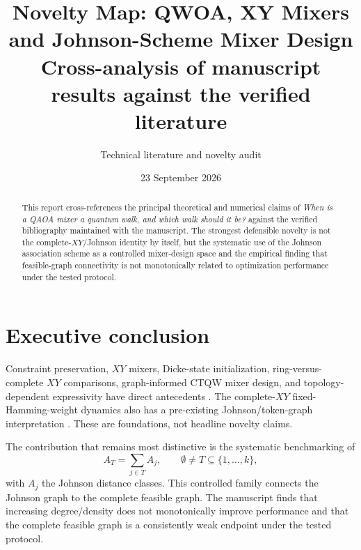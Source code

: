 \documentclass[11pt]{article}
\title{\textbf{Novelty Map: QWOA, XY Mixers and Johnson-Scheme Mixer Design}\\\large Cross-analysis of manuscript results against the verified literature}
\author{Technical literature and novelty audit}\date{23 September 2026}
\begin{document}
\maketitle
\begin{abstract}
This report cross-references the principal theoretical and numerical claims of
\emph{When is a QAOA mixer a quantum walk, and which walk should it be?} against the verified bibliography maintained with the manuscript. The strongest defensible novelty is not the complete-$XY$/Johnson identity by itself, but the systematic use of the Johnson association scheme as a controlled mixer-design space and the empirical finding that feasible-graph connectivity is not monotonically related to optimization performance under the tested protocol.
\end{abstract}

\section{Executive conclusion}
Constraint preservation, $XY$ mixers, Dicke-state initialization, ring-versus-complete $XY$ comparisons, graph-informed CTQW mixer design, and topology-dependent expressivity have direct antecedents \cite{Hadfield2019,Wang2020,Cook2019,He2023,Fuchs2022,Matwiejew2024,Kordonowy2026}. The complete-$XY$ fixed-Hamming-weight dynamics also has a pre-existing Johnson/token-graph interpretation \cite{FabilaMonroy2012Token,MinSeoHeo2026}. These are foundations, not headline novelty claims.

The contribution that remains most distinctive is the systematic benchmarking of
\[
A_T=\sum_{j\in T}A_j,\qquad \emptyset\neq T\subseteq\{1,\ldots,k\},
\]
with $A_j$ the Johnson distance classes. This controlled family connects the Johnson graph to the complete feasible graph. The manuscript finds that increasing degree/density does not monotonically improve performance and that the complete feasible graph is a consistently weak endpoint under the tested protocol.
\end{document}
